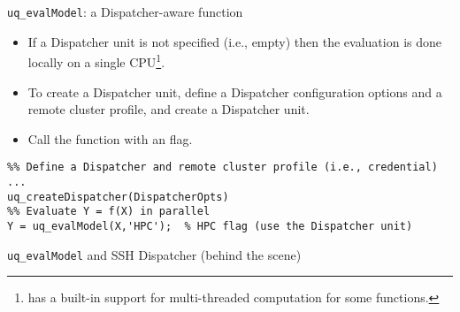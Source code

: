 \documentclass{rsuqbeamernew}
\begin{document}
\begin{frame}[fragile,t]{\texttt{uq\_evalModel}: a Dispatcher-aware function}
	\small

  \begin{itemize}
    \item If a Dispatcher unit is not specified (i.e., empty)
    then the evaluation is done locally on a single CPU\footnote{\matlab{} has
      a built-in support for multi-threaded computation for some functions.}.
    \item To create a Dispatcher unit, define a Dispatcher configuration options
    and a remote cluster profile, and create a Dispatcher unit.
    \item Call the function with an  flag.
  \end{itemize}

\begin{lstlisting}
%% Define a Dispatcher and remote cluster profile (i.e., credential)
...
uq_createDispatcher(DispatcherOpts) 
%% Evaluate Y = f(X) in parallel
Y = uq_evalModel(X,'HPC');  % HPC flag (use the Dispatcher unit)
\end{lstlisting}

\end{frame}

\begin{frame}[t]{\texttt{uq\_evalModel} and SSH Dispatcher (behind the scene)}
  \small
\end{frame}
\end{document}
